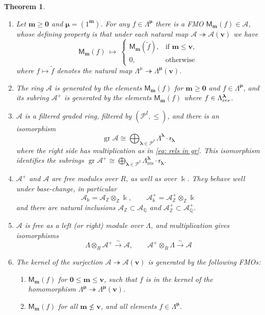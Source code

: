 \documentclass[11pt,reqno]{amsart}
\renewcommand{\mathbf}{\mathbold}
\numberwithin{equation}{section}
\newtheorem{Theorem}[equation]{Theorem}
\theoremstyle{definition}
\newcommand{\cA}{\mathcal{A}}
\newcommand{\cP}{\mathcal{P}}
\newcommand{\bm}{\mathbf{m}}
\newcommand{\bv}{\mathbf{v}}
\newcommand{\QQ}{\mathbb{Q}}
\newcommand{\ZZ}{\mathbb{Z}}
\DeclareMathOperator{\gr}{gr}
\newcommand{\kk}{\Bbbk}
\renewcommand{\bv}{\mathbf{v}} %
\newcommand{\M}{\mathsf{M}}
\newcommand{\sfr}{{\mathsf{r}}}
\newcommand{\vertexset}{I}
\newcommand{\GT}{\Lambda}
\newcommand{\base}{R}
\newcommand{\Partitions}{\cP}
\newcommand{\bla}{{\boldsymbol{\lambda}}}
\newcommand{\bmu}{{\boldsymbol{\mu}}}
\newcommand{\qzast}{\cA}
\newcommand{\qzastplus}{\cA^{+}}
\newcommand{\res}{\mathrm{res}}
\begin{document}
\begin{Theorem}
    \label{thm:limzastproperties}    
    \begin{enumerate}
        \item Let $\bm \geq \mathbf 0$ and $\bmu = (1^\bm)$.  For any $f \in \GT^\bmu$ there is a FMO $\M_\bm(f) \in \qzast$, whose defining property is that under each natural map $\qzast \twoheadrightarrow \qzast(\bv)$ we have
        $$
        \M_\bm(f) \ \mapsto \ \left\{ \begin{array}{cl} \M_\bm(\widetilde{f}), &\text{if } \bm \leq \bv, \\ 0, & \text{otherwise} \end{array} \right.
        $$
        where $f \mapsto \widetilde{f}$ denotes  the natural map $\GT^\mu \twoheadrightarrow \GT^\bmu(\bv)$. 

        \item The ring $\qzast$ is generated by the elements $\M_\bm(f)$ for $\bm\geq \mathbf 0$ and $f \in \GT^\bmu$, and its subring $\qzastplus$ is generated by the elements $\M_\bm(f)$ where $f \in \GT^\bla_{\text res}$.

        \item $\qzast$ is a  filtered graded ring, filtered by $(\Partitions^\vertexset, \leq)$, and there is an isomorphism
        $$
        \gr \qzast \cong \bigoplus_{\bla \in \Partitions^\vertexset} \GT^\bla \cdot \sfr_\bla
        $$
        where the right side has multiplication as in \eqref{eq: rels in gr}. This isomorphism identifies the subrings $\gr \qzastplus \cong \bigoplus_{\bla \in \Partitions^\vertexset} \GT^\bla_\res \cdot \sfr_\bla$.
        \item $\qzastplus$ and $\qzast$ are free modules over $\base$, as well as over $\kk$. They behave well under base-change, in particular
        $$
        \qzast_\kk = \qzast_\ZZ \otimes_\ZZ \kk, \qquad \qzastplus_\kk = \qzastplus_\ZZ \otimes_\ZZ \kk
        $$
        and there are natural inclusions $\qzast_\ZZ \subset \qzast_\QQ$ and $\qzastplus_\ZZ \subset \qzastplus_\QQ.$        
        \item $\qzast$ is free as a left (or right) module over $\GT$, and multiplication gives isomorphisms
        $$
        \GT \otimes_\base \qzastplus  \stackrel{\sim}{\longrightarrow} \qzast, \qquad \qzastplus \otimes_\base \GT \stackrel{\sim}{\longrightarrow} \qzast
        $$
                
        \item The kernel of the surjection $\qzast \twoheadrightarrow \qzast(\bv)$ is generated by the following FMOs:
        \begin{enumerate}[label=(\roman*),topsep=3pt,itemsep = 5pt]
            \item $\M_\bm(f)$ for $ \mathbf{0} \leq \bm \leq \bv$, such that $f$ is in the kernel of the homomorphism $\GT^{\bmu} \twoheadrightarrow \GT^{\bmu}(\bv)$.
            \item $\M_\bm(f)$ for all $\bm \not\leq \bv$, and all elements $f\in \GT^{\bmu}$.
        \end{enumerate}


\end{enumerate}
\end{Theorem}
\end{document}
